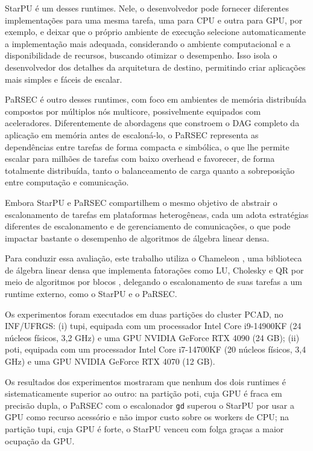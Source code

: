 \documentclass[12pt]{article}
\begin{document}
StarPU \cite{starpu} é um desses runtimes. Nele, o desenvolvedor pode fornecer diferentes implementações para uma mesma tarefa, uma para CPU e outra para GPU, por exemplo, e deixar que o próprio ambiente de execução selecione automaticamente a implementação mais adequada, considerando o ambiente computacional e a disponibilidade de recursos, buscando otimizar o desempenho. Isso isola o desenvolvedor dos detalhes da arquitetura de destino, permitindo criar aplicações mais simples e fáceis de escalar.

PaRSEC \cite{bosilca2011dague} é outro desses runtimes, com foco em ambientes de memória distribuída compostos por múltiplos nós multicore, possivelmente equipados com aceleradores. Diferentemente de abordagens que constroem o DAG completo da aplicação em memória antes de escaloná-lo, o PaRSEC representa as dependências entre tarefas de forma compacta e simbólica, o que lhe permite escalar para milhões de tarefas com baixo overhead e favorecer, de forma totalmente distribuída, tanto o balanceamento de carga quanto a sobreposição entre computação e comunicação.

Embora StarPU e PaRSEC compartilhem o mesmo objetivo de abstrair o escalonamento de tarefas em plataformas heterogêneas, cada um adota estratégias diferentes de escalonamento e de gerenciamento de comunicações, o que pode impactar bastante o desempenho de algoritmos de álgebra linear densa.

Para conduzir essa avaliação, este trabalho utiliza o Chameleon \cite{AGULLO2012473}, uma biblioteca de álgebra linear densa que implementa fatorações como LU, Cholesky e QR por meio de algoritmos por blocos \cite{DBLP}, delegando o escalonamento de suas tarefas a um runtime externo, como o StarPU e o PaRSEC.

Os experimentos foram executados em duas partições do cluster PCAD, no INF/UFRGS: (i) tupi, equipada com um processador Intel Core i9-14900KF (24 núcleos físicos, 3,2 GHz) e uma GPU NVIDIA GeForce RTX 4090 (24 GB); (ii) poti, equipada com um processador Intel Core i7-14700KF (20 núcleos físicos, 3,4 GHz) e uma GPU NVIDIA GeForce RTX 4070 (12 GB).

Os resultados dos experimentos mostraram que nenhum dos dois runtimes é sistematicamente superior ao outro: na partição poti, cuja GPU é fraca em precisão dupla, o PaRSEC com o escalonador \texttt{gd} superou o StarPU por usar a GPU como recurso acessório e não impor custo sobre os workers de CPU; na partição tupi, cuja GPU é forte, o StarPU venceu com folga graças a maior ocupação da GPU.
\end{document}
